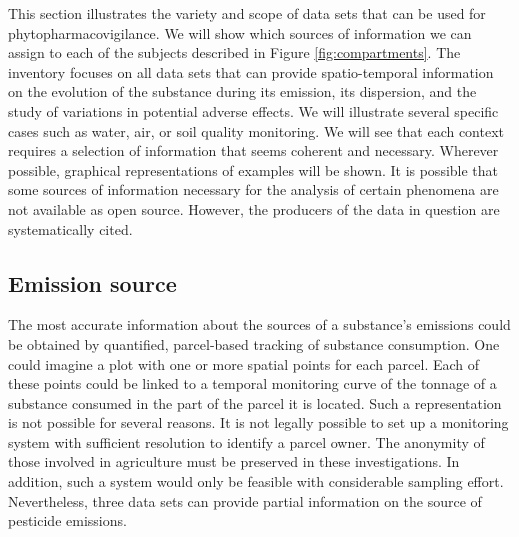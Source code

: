 This section illustrates the variety and scope of data sets that can be used for phytopharmacovigilance. We will show which sources of information we can assign to each of the subjects described in Figure \ref{fig:compartments}. The inventory focuses on all data sets that can provide spatio-temporal information on the evolution of the substance during its emission, its dispersion, and the study of variations in potential adverse effects. We will illustrate several specific cases such as water, air, or soil quality monitoring. We will see that each context requires a selection of information that seems coherent and necessary. Wherever possible, graphical representations of examples will be shown. It is possible that some sources of information necessary for the analysis of certain phenomena are not available as open source. However, the producers of the data in question are systematically cited.

\subsection{Emission source}

The most accurate information about the sources of a substance's emissions could be obtained by quantified, parcel-based tracking of substance consumption. One could imagine a plot with one or more spatial points for each parcel. Each of these points could be linked to a temporal monitoring curve of the tonnage of a substance consumed in the part of the parcel it is located. Such a representation is not possible for several reasons. It is not legally possible to set up a monitoring system with sufficient resolution to identify a parcel owner. The anonymity of those involved in agriculture must be preserved in these investigations. In addition, such a system would only be feasible with considerable sampling effort. Nevertheless, three data sets can provide partial information on the source of pesticide emissions. 


